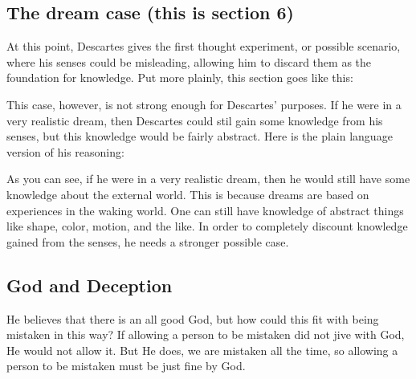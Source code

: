 \subsection{The dream case (this is section 6)}
At this point, Descartes gives the first thought experiment, or possible scenario, where his senses could be misleading, allowing him to discard them as the foundation for knowledge. Put more plainly, this section goes like this:


This case, however, is not strong enough for Descartes' purposes. If he were in a very realistic dream, then Descartes could stil gain some knowledge from his senses, but this knowledge would be fairly abstract. Here is the plain language version of his reasoning:

As you can see, if he were in a very realistic dream, then he would still have some knowledge about the external world. This is because dreams are based on experiences in the waking world. One can still have knowledge of abstract things like shape, color, motion, and the like. In order to completely discount knowledge gained from the senses, he needs a stronger possible case.
\subsection{God and Deception}

He believes that there is an all good God, but how could this fit with being mistaken in this way? If allowing a person to be mistaken did not jive with God, He would not allow it. But He does, we are mistaken all the time, so allowing a person to be mistaken must be just fine by God.

